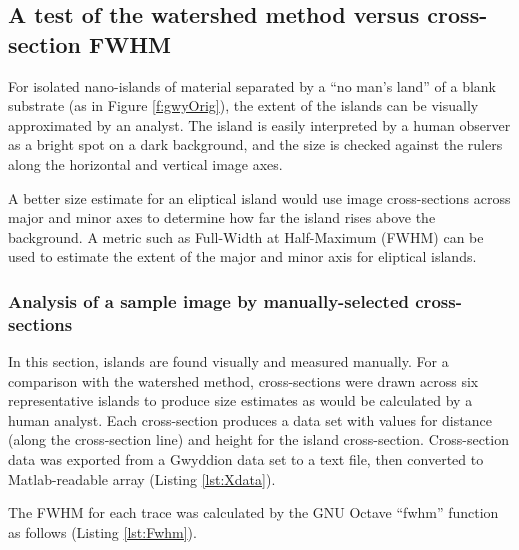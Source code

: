 \documentclass[12pt,oneside,english]{article}
\begin{document}
	\subsection{A test of the watershed method versus cross-section FWHM}
	
		For isolated nano-islands of material separated by a ``no man's land'' of a blank substrate (as in Figure \ref{f:gwyOrig}), the extent of the islands can be visually approximated by an analyst.
		The island is easily interpreted by a human observer as a bright spot on a dark background, and the size is checked against the rulers along the horizontal and vertical image axes. 
			
		A better size estimate for an eliptical island would use image cross-sections across major and minor axes to determine how far the island rises above the background.
		A metric such as Full-Width at Half-Maximum (FWHM) can be used to estimate the extent of the major and minor axis for eliptical islands.
			
	
	\subsubsection{Analysis of a sample image by manually-selected cross-sections}
		  
		In this section, islands are found visually and measured manually. 
	For a comparison with the watershed method, cross-sections were drawn across six representative islands to produce size estimates as would be calculated by a human analyst.  
	Each cross-section produces a data set with values for distance (along the cross-section line) and height for the island cross-section.  
	Cross-section data was exported from a Gwyddion data set to a text file, then converted to Matlab-readable array (Listing \ref{lst:Xdata}).   
	
	The FWHM for each trace was calculated by the GNU Octave ``fwhm'' function as follows (Listing \ref{lst:Fwhm}).

\end{document}
